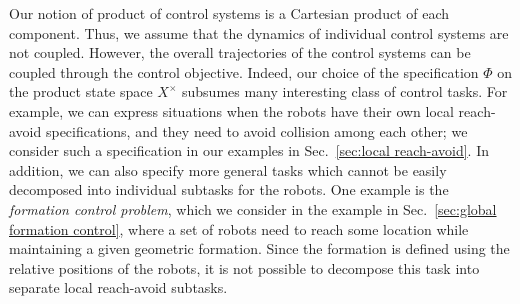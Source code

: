 Our notion of product of control systems is a Cartesian product of each component. Thus, we assume that the dynamics of individual control
systems are not coupled.
However, the overall trajectories of the control systems can be coupled through the control objective.
Indeed, our choice of the specification $\Phi$ on the product state space $X^\times$ subsumes many interesting class of control tasks.
For example, we can express situations when the robots have their own local reach-avoid specifications, and they 
need to avoid collision among each other; we consider such a specification in our examples in Sec.~\ref{sec:local reach-avoid}.
In addition, we can also specify more general tasks which cannot be easily decomposed into individual subtasks for the robots.
One example is the \emph{formation control problem}, which we consider in the example in Sec.~\ref{sec:global formation control}, where a set of robots need to 
reach some location while maintaining a given geometric formation. 
Since the formation is defined using the relative positions of the robots, it is not possible to decompose this task into separate local reach-avoid subtasks.
%
